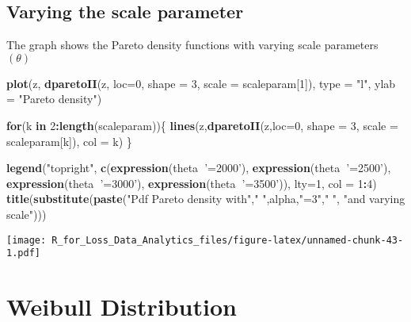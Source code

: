\documentclass[]{book}
\newenvironment{Shaded}{\begin{snugshade}}{\end{snugshade}}
\newcommand{\KeywordTok}[1]{\textcolor[rgb]{0.13,0.29,0.53}{\textbf{#1}}}
\newcommand{\DataTypeTok}[1]{\textcolor[rgb]{0.13,0.29,0.53}{#1}}
\newcommand{\DecValTok}[1]{\textcolor[rgb]{0.00,0.00,0.81}{#1}}
\newcommand{\StringTok}[1]{\textcolor[rgb]{0.31,0.60,0.02}{#1}}
\newcommand{\ControlFlowTok}[1]{\textcolor[rgb]{0.13,0.29,0.53}{\textbf{#1}}}
\newcommand{\OperatorTok}[1]{\textcolor[rgb]{0.81,0.36,0.00}{\textbf{#1}}}
\newcommand{\NormalTok}[1]{#1}
\theoremstyle{definition}
\theoremstyle{definition}
\theoremstyle{definition}
\theoremstyle{remark}
\begin{document}
\subsection{Varying the scale
parameter}\label{varying-the-scale-parameter-1}

The graph shows the Pareto density functions with varying scale
parameters \((\theta)\)

\begin{Shaded}
\begin{Highlighting}[]
\KeywordTok{plot}\NormalTok{(z, }\KeywordTok{dparetoII}\NormalTok{(z, }\DataTypeTok{loc=}\DecValTok{0}\NormalTok{, }\DataTypeTok{shape =} \DecValTok{3}\NormalTok{, }\DataTypeTok{scale =}\NormalTok{ scaleparam[}\DecValTok{1}\NormalTok{]), }\DataTypeTok{type =} \StringTok{"l"}\NormalTok{, }\DataTypeTok{ylab =} \StringTok{"Pareto density"}\NormalTok{)}

\ControlFlowTok{for}\NormalTok{(k }\ControlFlowTok{in} \DecValTok{2}\OperatorTok{:}\KeywordTok{length}\NormalTok{(scaleparam))\{}
  \KeywordTok{lines}\NormalTok{(z,}\KeywordTok{dparetoII}\NormalTok{(z,}\DataTypeTok{loc=}\DecValTok{0}\NormalTok{, }\DataTypeTok{shape =} \DecValTok{3}\NormalTok{, }\DataTypeTok{scale =}\NormalTok{ scaleparam[k]), }\DataTypeTok{col =}\NormalTok{ k)}
\NormalTok{\}}

\KeywordTok{legend}\NormalTok{(}\StringTok{"topright"}\NormalTok{, }\KeywordTok{c}\NormalTok{(}\KeywordTok{expression}\NormalTok{(theta}\OperatorTok{~}\StringTok{'=2000'}\NormalTok{), }\KeywordTok{expression}\NormalTok{(theta}\OperatorTok{~}\StringTok{'=2500'}\NormalTok{), }\KeywordTok{expression}\NormalTok{(theta}\OperatorTok{~}\StringTok{'=3000'}\NormalTok{), }\KeywordTok{expression}\NormalTok{(theta}\OperatorTok{~}\StringTok{'=3500'}\NormalTok{)), }\DataTypeTok{lty=}\DecValTok{1}\NormalTok{, }\DataTypeTok{col =} \DecValTok{1}\OperatorTok{:}\DecValTok{4}\NormalTok{)}
\KeywordTok{title}\NormalTok{(}\KeywordTok{substitute}\NormalTok{(}\KeywordTok{paste}\NormalTok{(}\StringTok{"Pdf Pareto density with"}\NormalTok{,}\StringTok{" "}\NormalTok{,alpha,}\StringTok{"=3"}\NormalTok{,}\StringTok{" "}\NormalTok{, }\StringTok{"and varying scale"}\NormalTok{)))}
\end{Highlighting}
\end{Shaded}

\texttt{[image: R\_for\_Loss\_Data\_Analytics\_files/figure-latex/unnamed-chunk-43-1.pdf]}

\section{Weibull Distribution}\label{weibull-distribution}
\end{document}
